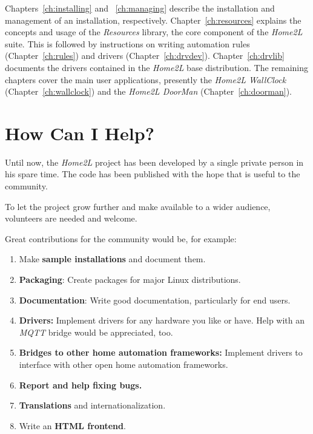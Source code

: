 \documentclass[12pt,english,parskip=half]{scrreprt}
\begin{document}
Chapters~\ref{ch:installing} and ~\ref{ch:managing} describe the installation and management
of an installation, respectively. Chapter~\ref{ch:resources} explains the concepts and usage
of the \emph{Resources} library, the core component of the \emph{Home2L} suite.
This is followed by instructions on writing automation rules (Chapter~\ref{ch:rules}) and
drivers (Chapter~\ref{ch:drvdev}).
Chapter~\ref{ch:drvlib} documents the drivers contained in the \emph{Home2L} base distribution.
The remaining chapters cover the main user applications, presently 
the \emph{Home2L WallClock} (Chapter~\ref{ch:wallclock}) and 
the \emph{Home2L DoorMan} (Chapter~\ref{ch:doorman}).





\section{How Can I Help?}
\label{sec:helping}


Until now, the \emph{Home2L}  project has been developed by a single private person
in his spare time. The code has been published with the hope that is useful to
the community.

To let the project grow further and make available to a wider audience,
volunteers are needed and welcome.

Great contributions for the community would be, for example:

\begin{enumerate}
  \item Make \textbf{sample installations} and document them.

  \item \textbf{Packaging}: Create packages for major Linux distributions.

  \item \textbf{Documentation}: Write good documentation, particularly for end users.

  \item \textbf{Drivers:} Implement drivers for any hardware you like or have.
    Help with an \emph{MQTT} bridge would be appreciated, too.

  \item \textbf{Bridges to other home automation frameworks:} Implement drivers to interface
    with other open home automation frameworks.
    
  \item \textbf{Report and help fixing bugs.}

  \item \textbf{Translations} and internationalization.

  \item Write an \textbf{HTML frontend}.
\end{enumerate}
\end{document}
